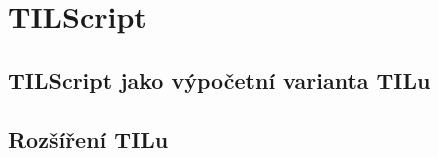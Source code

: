 \chapter{TILScript}

\section{TILScript jako výpočetní varianta TILu}

\section{Rozšíření TILu}

\endinput

